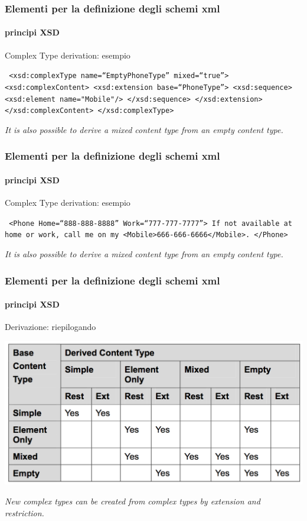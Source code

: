 \begin{frame}
	\frametitle{Elementi per la definizione degli schemi xml}
	\framesubtitle{principi XSD}
	\addtocounter{nframe}{1}

	\begin{block}{Complex Type derivation: esempio}

		\texttt{
			<xsd:complexType name=``EmptyPhoneType'' mixed=``true''>
			<xsd:complexContent>
			<xsd:extension base=``PhoneType''>
			<xsd:sequence>
			<xsd:element name="Mobile"/>
			</xsd:sequence>
			</xsd:extension>
			</xsd:complexContent>
			</xsd:complexType>
		}
	\end{block}
	\textit{It is also possible to derive a mixed content type from an empty content type.}
\end{frame}

\begin{frame}
	\frametitle{Elementi per la definizione degli schemi xml}
	\framesubtitle{principi XSD}
	\addtocounter{nframe}{1}

	\begin{block}{Complex Type derivation: esempio}

		\texttt{
			<Phone Home=``888-888-8888'' Work=``777-777-7777''>
			If not available at home or work, call me on my
			<Mobile>666-666-6666</Mobile>.
			</Phone>
		}
	\end{block}
	\textit{It is also possible to derive a mixed content type from an empty content type.}
\end{frame}




\begin{frame}
	\frametitle{Elementi per la definizione degli schemi xml}
	\framesubtitle{principi XSD}
	\addtocounter{nframe}{1}

	\begin{block}{Derivazione: riepilogando}

		\includegraphics[width=.95\textwidth]{imgs/TabellaContentTypeDerivation.png}

	\end{block}

	\textit{New complex types can be created from complex types by extension and restriction.}
\end{frame}




